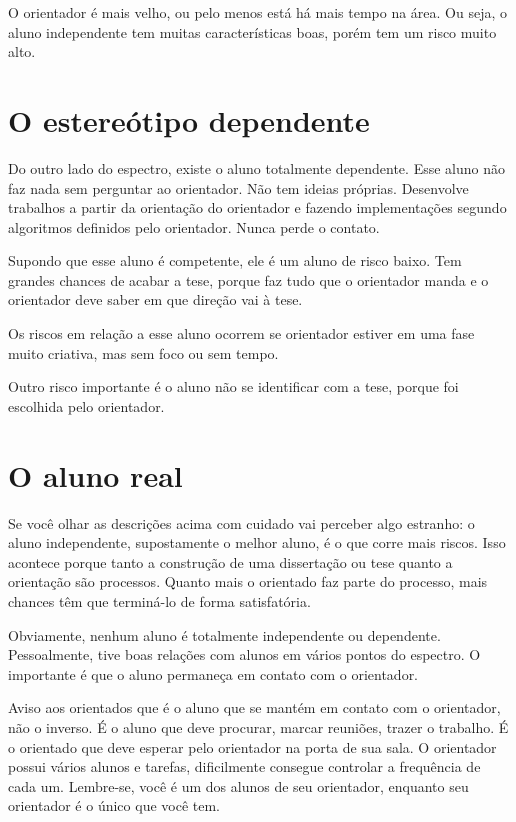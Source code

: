 O orientador é mais velho, ou pelo menos está há mais tempo na área. Ou seja, o aluno independente tem muitas características boas, porém tem um risco muito alto.


\section{O estereótipo dependente}


Do outro lado do espectro, existe o aluno totalmente dependente. Esse aluno não faz nada sem perguntar ao orientador. Não tem ideias próprias. Desenvolve trabalhos a partir da orientação do orientador e fazendo implementações segundo algoritmos definidos pelo orientador. Nunca perde o contato. 


Supondo que esse aluno é competente, ele é um aluno de risco baixo. Tem grandes chances de acabar a tese, porque faz tudo que o orientador manda e o orientador deve saber em que direção vai à tese. 


Os riscos em relação a esse aluno ocorrem se orientador estiver em uma fase muito criativa, mas sem foco ou sem tempo. 


Outro risco importante é o aluno não se identificar com a tese, porque foi escolhida pelo orientador. 


\section{O aluno real}


Se você olhar as descrições acima com cuidado vai perceber algo estranho: o aluno independente, supostamente o melhor aluno, é o que corre mais riscos. Isso acontece porque tanto a construção de uma dissertação ou tese quanto a orientação são processos. Quanto mais o orientado faz parte do processo, mais chances têm que terminá-lo de forma satisfatória.


Obviamente, nenhum aluno é totalmente independente ou dependente. Pessoalmente, tive boas relações com alunos em vários pontos do espectro. O importante é que o aluno permaneça em contato com o orientador. 


Aviso aos orientados que é o aluno que se mantém em contato com o orientador, não o inverso. É o aluno que deve procurar, marcar reuniões, trazer o trabalho. É o orientado que deve esperar pelo orientador na porta de sua sala. O orientador possui vários alunos e tarefas, dificilmente consegue controlar a frequência de cada um. Lembre-se, você é um dos alunos de seu orientador, enquanto seu orientador é o único que você tem.


